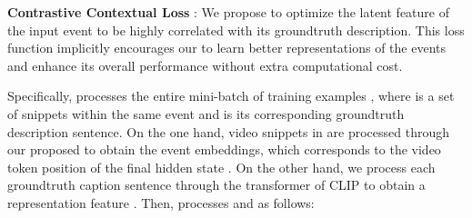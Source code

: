 \documentclass[letterpaper]{article} \usepackage{aaai23}  \usepackage{times}  \usepackage{helvet}  \usepackage{courier}  \usepackage[hyphens]{url}  \usepackage{graphicx} \urlstyle{rm} \def\UrlFont{\rm}  \usepackage{natbib}  \usepackage{caption} \frenchspacing  \setlength{\pdfpagewidth}{8.5in}  \setlength{\pdfpageheight}{11in}  \usepackage{algorithm}
\begin{document}
\begin{table*}[!ht]
\centering
\caption{Performance comparison of \model with other SOTA models on ActivityNet Captions \textit{ae-test}.  denotes results by us.} 
\label{tab:anet_test}
\end{table*}

\noindent\textbf{Contrastive Contextual Loss }:
We propose  to optimize the latent feature of the input event to be highly correlated with its groundtruth description. This loss function implicitly encourages our \model to learn better representations of the events and enhance its overall performance without extra computational cost. 

Specifically,  processes the entire mini-batch of training examples , where  is a set of snippets within the same event and  is its corresponding groundtruth description sentence. 
On the one hand, video snippets in  are processed through our proposed \model to obtain the event embeddings, which corresponds to the video token position  of the final hidden state . On the other hand, we process each groundtruth caption sentence  through the transformer  of CLIP \cite{radford2021learning} to obtain a representation feature . Then,  processes  and  as follows:
\end{document}
